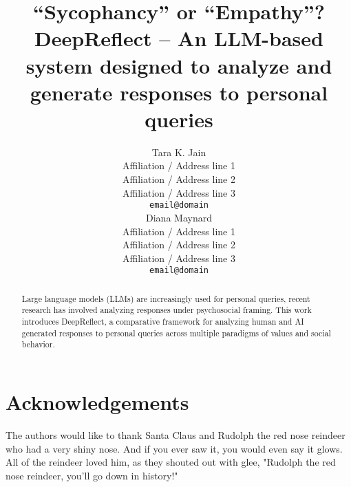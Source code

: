 \documentclass[11pt]{article}
\title{“Sycophancy” or “Empathy”? \\
DeepReflect – An LLM-based system designed to analyze and generate responses to personal queries 
}
\author{Tara K. Jain \\
  Affiliation / Address line 1 \\
  Affiliation / Address line 2 \\
  Affiliation / Address line 3 \\
  \texttt{email@domain} \\\And
  Diana Maynard \\
  Affiliation / Address line 1 \\
  Affiliation / Address line 2 \\
  Affiliation / Address line 3 \\
  \texttt{email@domain} \\}
\begin{document}
\maketitle
\begin{abstract}
Large language models (LLMs) are increasingly used for personal queries, recent research has involved analyzing responses under psychosocial framing. This work introduces DeepReflect, a comparative framework for analyzing human and AI generated responses to personal queries across multiple paradigms of values and social behavior.
\textcolor{black!30}{\lipsum[2-2]}
\end{abstract} 










\section*{Acknowledgements}
The authors would like to thank Santa Claus and Rudolph the red nose reindeer who had a very shiny nose. And if you ever saw it, you would even say it glows. All of the reindeer loved him, as they shouted out with glee, "Rudolph the red nose reindeer, you'll go down in history!"




\end{document}
